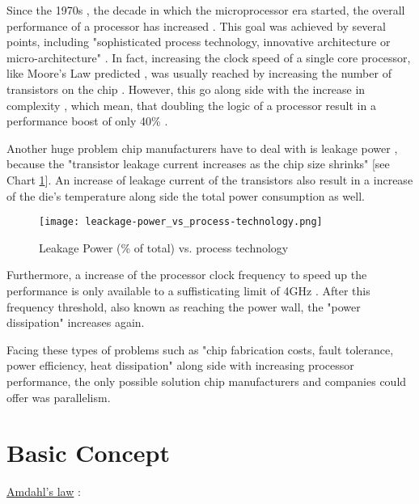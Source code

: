 Since the 1970s \parencite{article14}, the decade in which the microprocessor era started, the overall performance of a processor has increased \parencite{inproceedings4}. This goal was achieved by several points, including "sophisticated process technology, innovative architecture or micro-architecture" \parencite[see][Chapter 1, p2]{inproceedings4}. In fact, increasing the clock speed of a single core processor, like Moore's Law predicted \parencite{article14}, was usually reached by increasing the number of transistors on the chip \parencite{article14}. However, this go along side with the increase in complexity \parencite[see][Pollack’s rule]{article14}, which mean, that doubling the logic of a processor result in a performance boost of only 40\% \parencite[see][Chapter 2]{article14}.

Another huge problem chip manufacturers have to deal with is leakage power \parencite[see][Chapter 2, p3]{inproceedings4}, because the "transistor leakage current increases as the chip size shrinks" \parencite[see][p2]{article14} [see Chart \ref{fig:leackagePer}]. An increase of leakage current of the transistors also result in a increase of the die's temperature \parencite{inproceedings4} along side the total power consumption as well.
\begin{figure}[h!]
	\centering
	\texttt{[image: leackage-power\_vs\_process-technology.png]}
	\caption{
		Leakage Power (\% of total) vs. process technology \parencite{inproceedings4}
	}
	\label{fig:leackagePer}
\end{figure}

Furthermore, a increase of the processor clock frequency to speed up the performance is only available to a suffisticating limit of 4GHz \parencite{article14}. After this frequency threshold, also known as reaching the power wall, the "power dissipation" \parencite[see][p2]{article14} increases again.

Facing these types of problems such as "chip fabrication costs, fault tolerance, power efficiency, heat dissipation" \parencite[see][p3]{article14} along side with increasing processor performance, the only possible solution chip manufacturers and companies could offer was parallelism. 

\newpage

\section{Basic Concept}

\underline{Amdahl's law} \parencite{book6}:

